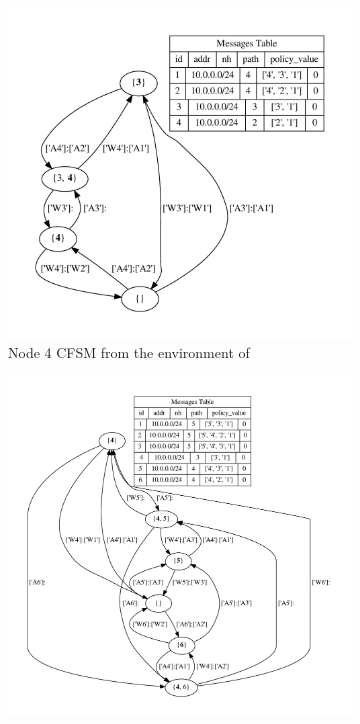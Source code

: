 \begin{figure}[h]
     \centering
     \begin{subfigure}[b]{0.45\textwidth}
         \centering
         \includegraphics[width=\textwidth]{images/fsm/fig_4_4.pdf}
		 \caption{Node \num{4} \ac{CFSM} from the environment of }
         \label{fig:fsm_node4}
     \end{subfigure}
     \hfill
     \begin{subfigure}[b]{0.45\textwidth}
         \centering
         \includegraphics[width=\textwidth]{images/fsm/fig_4_5.pdf}

\end{subfigure}
\end{figure}
